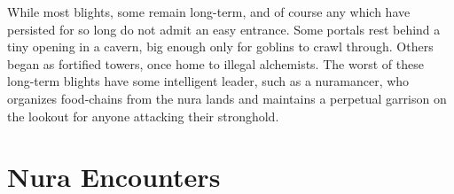 \begin{multicols}{2}
While most \glspl{blight}, some remain long-term, and of course any which have persisted for so long do not admit an easy entrance.
Some portals rest behind a tiny opening in a cavern, big enough only for goblins to crawl through.
Others began as fortified towers, once home to illegal alchemists.
The worst of these long-term \glspl{blight} have some intelligent leader, such as a nuramancer, who organizes food-chains from the nura lands and maintains a perpetual garrison on the lookout for anyone attacking their stronghold.

\end{multicols}

\encNura
{}

\section{Nura Encounters}

